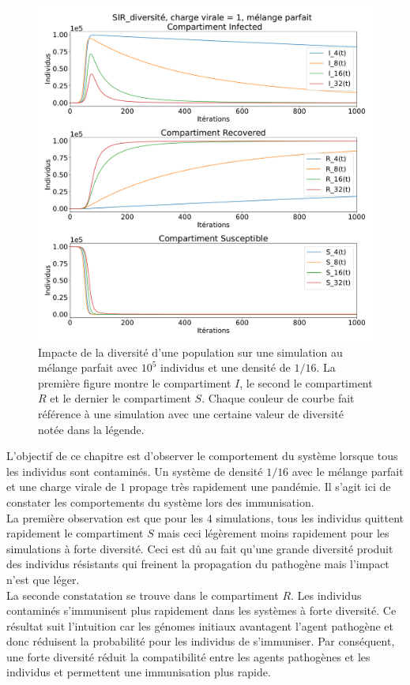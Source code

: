 \newpage

\begin{figure}[h]
	\centering
	\captionsetup{justification=centering}
	\includegraphics[width=.8\textwidth]{Images/SIR_diversite_mix.pdf}
	\caption[Impacte de la diversité]{Impacte de la diversité d'une population sur une simulation au mélange parfait avec $10^5$ individus et une densité de $1/16$. La première figure montre le compartiment $I$, le second le compartiment $R$ et le dernier le compartiment $S$. Chaque couleur de courbe fait référence à une simulation avec une certaine valeur de diversité notée dans la légende.}
\end{figure}

L'objectif de ce chapitre est d'observer le comportement du système lorsque tous les individus sont contaminés. Un système de densité $1/16$ avec le mélange parfait et une charge virale de $1$ propage très rapidement une pandémie. Il s'agit ici de constater les comportements du système lors des immunisation.\\

La première observation est que pour les $4$ simulations, tous les individus quittent rapidement le compartiment $S$ mais ceci légèrement moins rapidement pour les simulations à forte diversité. Ceci est dû au fait qu'une grande diversité produit des individus résistants qui freinent la propagation du pathogène mais l'impact n'est que léger.\\

La seconde constatation se trouve dans le compartiment $R$. Les individus contaminés s'immunisent plus rapidement dans les systèmes à forte diversité. Ce résultat suit l'intuition car les génomes initiaux avantagent l'agent pathogène et donc réduisent la probabilité pour les individus de s'immuniser. Par conséquent, une forte diversité réduit la compatibilité entre les agents pathogènes et les individus et permettent une immunisation plus rapide.

